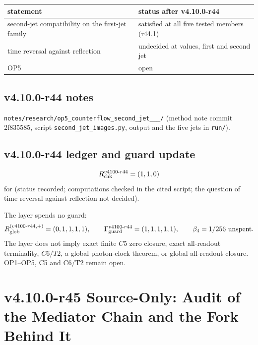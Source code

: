 \begin{center}
\small
\begin{tabular}{@{}>{\raggedright\arraybackslash}p{}>{\raggedright\arraybackslash}p{}@{}}
\toprule
statement & status after v4.10.0-r44\\
\midrule
second-jet compatibility on the first-jet family & satisfied at all five tested members (r44.1)\\
time reversal against reflection & undecided at values, first and second jet\\
OP5 & open\\
\bottomrule
\end{tabular}
\end{center}

\subsection*{v4.10.0-r44 notes}
\label{subsec:v4100-r44-notes}

\texttt{notes/\allowbreak research/\allowbreak op5\_\allowbreak counterflow\_\allowbreak second\_\allowbreak jet\_\_\_/} (method note commit 2f835585,
script \texttt{second\_\allowbreak jet\_\allowbreak images.py}, output and the five jets in \texttt{run/}).

\subsection*{v4.10.0-r44 ledger and guard update}
\label{subsec:v4100-r44-ledger-guard}

\[
R_{\rm chk}^{v4100\text{-}r44}=(1,1,0)
\]
for (status recorded; computations checked in the cited script; the question of time reversal against reflection not decided).

The layer spends no guard:
\[
R_{\rm glob}^{(v4100\text{-}r44,+)}=(0,1,1,1,1),
\qquad
\Gamma_{\rm guard}^{v4100\text{-}r44}=(1,1,1,1,1),
\qquad
\beta_4=1/256\ \text{unspent}.
\]
The layer does not imply exact finite \(C5\) zero closure, exact all-readout terminality, \(C6/T2\), a global photon-clock theorem,
or global all-readout closure.  OP1--OP5, C5 and C6/T2 remain open.

\clearpage
\section*{v4.10.0-r45 Source-Only: Audit of the Mediator Chain and the Fork Behind It}
\label{sec:v4100-r45-mediator-audit}

